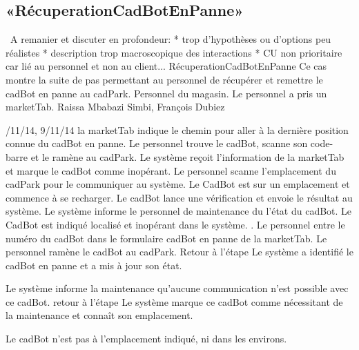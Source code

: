 \subsection{«RécuperationCadBotEnPanne»}
\TODO\ A remanier et discuter en profondeur: 
* trop d'hypothèses ou d'options peu réalistes
* description trop macroscopique des interactions
* CU non prioritaire car lié au personnel et non au client...
\startCU
\nom RécuperationCadBotEnPanne
\but Ce cas montre la suite de pas permettant au personnel de récupérer et remettre le cadBot en panne au cadPark.
\acteur Personnel du magasin.
\precondition Le personnel a pris un marketTab.
\auteur Raissa Mbabazi Simbi, François Dubiez
\date 7/11/14, 9/11/14
\nominal %
\startnominal
{} la marketTab indique le chemin pour aller à la dernière position connue du cadBot en panne.
\etape[RCP:SE1] Le personnel trouve le cadBot, scanne son code-barre et le ramène au cadPark.
\etape Le système reçoit l'information de la marketTab et marque le cadBot comme inopérant.
\etape Le personnel scanne l'emplacement du cadPark pour le communiquer au système.
 Le CadBot est sur un emplacement et commence à se recharger.
 Le cadBot lance une vérification et envoie le résultat au système. 
\etape Le système informe le personnel de maintenance du l'état du cadBot.
\stopnominal
\postcondition Le CadBot est indiqué localisé et inopérant dans le système.
.
\alternatifs
\startalternatif[RCP:SE1]
\etape Le personnel entre le numéro du cadBot dans le formulaire cadBot en panne de la marketTab.
\etape Le personnel ramène le cadBot au cadPark.
\etape Retour à l'étape 
\stopcondition
\postcondition Le système a identifié le cadBot en panne et a mis à jour son état.
\stopalternatif


\etape Le système informe la maintenance qu'aucune communication n'est possible avec ce cadBot.
\etape retour à l'étape 
\stopcondition
\postcondition Le système marque ce cadBot comme nécessitant de la maintenance et connaît son emplacement.
\stopalternatif


\exception
Le cadBot n'est pas à l'emplacement indiqué, ni dans les environs.
\stopCU
